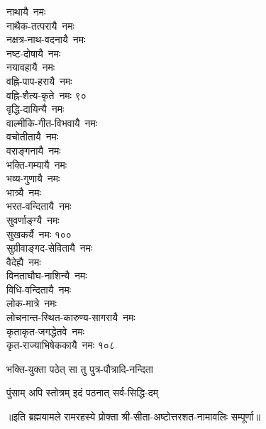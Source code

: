 \begin{multicols}{2}
\begin{flushleft}
नाथायै~नमः\\
नाथैक-तत्परायै~नमः\\
नक्षत्र-नाथ-वदनायै~नमः\\
नष्ट-दोषायै~नमः\\
नयावहायै~नमः\\
वह्नि-पाप-हरायै~नमः \\
वह्नि-शैत्य-कृते~नमः  \hfill ९०\\
वृद्धि-दायिन्यै~नमः\\
वाल्मीकि-गीत-विभवायै~नमः\\
वचोतीतायै~नमः\\
वराङ्गनायै~नमः \\
भक्ति-गम्यायै~नमः \\
भव्य-गुणायै~नमः\\
भात्र्यै~नमः \\
भरत-वन्दितायै~नमः\\
सुवर्णाङ्ग्यै~नमः\\
सुखकर्यै~नमः \hfill १००\\
सुग्रीवाङ्गद-सेवितायै~नमः\\
वैदेह्यै~नमः \\
विनताघौघ-नाशिन्यै~नमः\\
विधि-वन्दितायै~नमः  \\
लोक-मात्रे~नमः \\
लोचनान्त-स्थित-कारुण्य-सागरायै~नमः\\
कृताकृत-जगद्धेतवे~नमः\\
कृत-राज्याभिषेककायै~नमः \hfill १०८
\end{flushleft}
\end{multicols}

{भक्ति-युक्ता पठेत् सा तु पुत्र-पौत्रादि-नन्दिता}

{पुंसाम् अपि स्तोत्रम् इदं पठनात् सर्व-सिद्धि-दम्}


॥इति ब्रह्मयामले रामरहस्ये प्रोक्ता श्री-सीता-अष्टोत्तरशत-नामावलिः सम्पूर्णा॥
